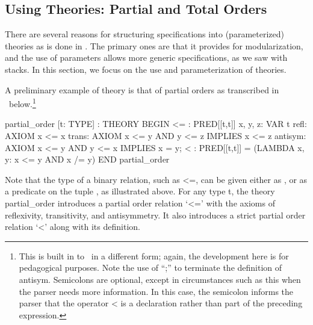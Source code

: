 \subsection{Using Theories: Partial and Total Orders}
\label{using-theories}

There are several reasons for structuring specifications into
(parameterized) theories as is done in \pvs\@.  The primary ones are
that it provides for modularization, and the use of parameters allows
more generic specifications, as we saw with stacks.  In this section, we
focus on the use and parameterization of theories.

A preliminary example of theory is that of partial orders as
transcribed in \pvs\ below.\footnote{This is built in to \pvs\ in a
different form; again, the development here is for pedagogical
purposes. Note the use of ``;'' to terminate the definition of {\stt
antisym}. Semicolons are optional, except in circumstances such as
this when the parser needs more information.  In this case, the
semicolon informs the parser that the operator {\stt <} is a
declaration rather than part of the preceding expression.}
\begin{pvsex}
  partial\_order [t: TYPE] : THEORY
   BEGIN
    <= : PRED[[t,t]]
    x, y, z: VAR t
    refl: AXIOM x <= x
    trans: AXIOM  x <= y AND y <= z IMPLIES x <= z
    antisym: AXIOM x <= y AND y <= x IMPLIES x = y;
    < : PRED[[t,t]] = (LAMBDA x, y: x <= y AND x /= y)
   END partial\_order
\end{pvsex}
%
Note that the type of a binary relation, such as {\stt <=}, can be given
either as {\stt [t, t -> bool]}, or as a predicate on the tuple {\stt
[t, t]}, as illustrated above.
For any type {\stt t}, the theory {\stt partial\_order} introduces a
partial order relation `{\stt <=}' with the axioms of reflexivity,
transitivity, and antisymmetry.  It also introduces a strict partial
order relation `{\stt <}' along with its definition. 

